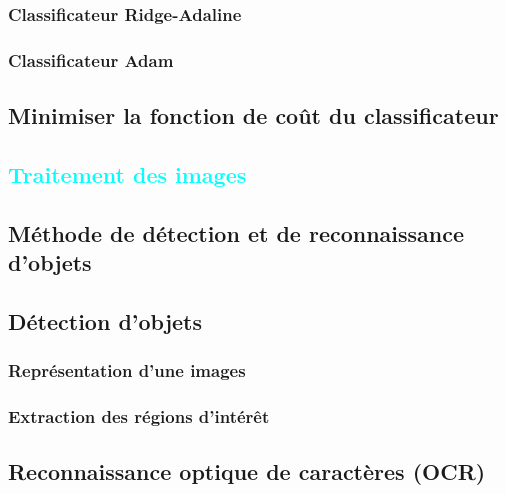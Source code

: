 \subsection{Classificateur Ridge-Adaline}
	\lipsum[1]
\subsection{Classificateur Adam}
	\lipsum[1]
	
\section{Minimiser la fonction de coût du classificateur}
	\lipsum[1]
	\lipsum[2]


\textcolor{cyan}{\chapter{Traitement des images}}

\section{Méthode de détection et de reconnaissance d'objets}
	\lipsum[1]

\section{Détection d'objets }
\subsection{Représentation d'une images}
	\lipsum[1]
	\lipsum[2]
	
\subsection{Extraction des régions d'intérêt}
	\lipsum[1]
	
\section{Reconnaissance optique de caractères (OCR)}
	\lipsum[1]




